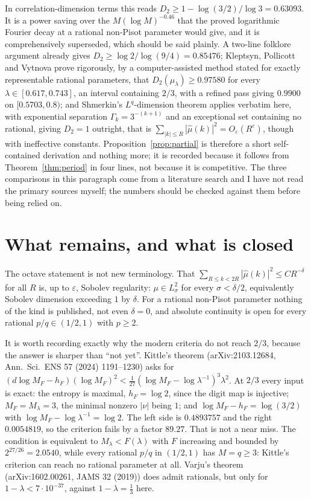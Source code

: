 \documentclass[11pt]{article}
\theoremstyle{remark}
\newcommand{\lam}{\lambda}
\newcommand{\eps}{\varepsilon}
\begin{document}
In correlation-dimension terms this reads $D_2\ge1-\log(3/2)/\log3=0.63093$. It is a power saving over
the $M(\log M)^{-0.46}$ that the proved logarithmic Fourier decay at a rational non-Pisot parameter would
give, and it is comprehensively superseded, which should be said plainly. A two-line folklore argument
already gives $D_2\ge\log2/\log(9/4)=0.85476$; Kleptsyn, Pollicott and Vytnova prove rigorously, by a
computer-assisted method stated for exactly representable rational parameters, that
$D_2(\mu_\lam)\ge0.97580$ for every $\lam\in[0.617,0.743]$, an interval containing $2/3$, with a refined
pass giving $0.9900$ on $[0.5703,0.8)$; and Shmerkin's $L^q$-dimension theorem applies verbatim here,
with exponential separation $\Gamma_k=3^{-(k+1)}$ and an exceptional set containing no rational, giving
$D_2=1$ outright, that is $\sum_{|k|\le R}|\hat\mu(k)|^2=O_\eps(R^\eps)$, though with ineffective
constants. Proposition~\ref{prop:partial} is therefore a short self-contained derivation and nothing
more; it is recorded because it follows from Theorem~\ref{thm:period} in four lines, not because it is
competitive. The three comparisons in this paragraph come from a literature search and I have not read
the primary sources myself; the numbers should be checked against them before being relied on.

\section{What remains, and what is closed}

The octave statement is not new terminology. That $\sum_{R\le k<2R}|\hat\mu(k)|^2\le CR^{-\delta}$ for all
$R$ is, up to $\eps$, Sobolev regularity: $\mu\in L^2_\sigma$ for every $\sigma<\delta/2$, equivalently
Sobolev dimension exceeding $1$ by $\delta$. For a rational non-Pisot parameter nothing of the kind is
published, not even $\delta=0$, and absolute continuity is open for every rational $p/q\in(1/2,1)$ with
$p\ge2$.

It is worth recording exactly why the modern criteria do not reach $2/3$, because the answer is sharper
than ``not yet''. Kittle's theorem (arXiv:2103.12684, Ann.\ Sci.\ ENS 57 (2024) 1191--1230) asks for
$(d\log M_F-h_F)(\log M_F)^2<\tfrac1{27}(\log M_F-\log\lam^{-1})^3\lam^2$. At $2/3$ every input is
exact: the entropy is maximal, $h_F=\log2$, since the digit map is injective; $M_F=M_\lam=3$, the
minimal nonzero $|\nu|$ being $1$; and $\log M_F-h_F=\log(3/2)$ with $\log M_F-\log\lam^{-1}=\log2$. The
left side is $0.4893757$ and the right $0.0054819$, so the criterion fails by a factor $89.27$. That is
not a near miss. The condition is equivalent to $M_\lam<F(\lam)$ with $F$ increasing and bounded by
$2^{27/26}=2.0540$, while every rational $p/q$ in $(1/2,1)$ has $M=q\ge3$: Kittle's criterion can reach
no rational parameter at all. Varju's theorem (arXiv:1602.00261, JAMS 32 (2019)) does admit rationals,
but only for $1-\lam<7\cdot10^{-37}$, against $1-\lam=\tfrac13$ here.
\end{document}

